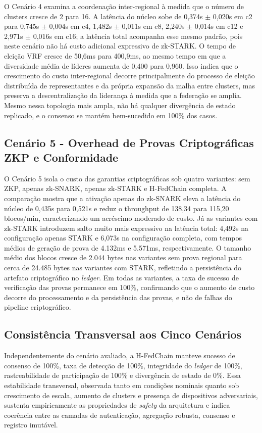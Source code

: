 \documentclass[12pt]{article}
\begin{document}
O Cenário 4 examina a coordenação inter-regional à medida que o número de clusters cresce de 2 para 16. A latência do núcleo sobe de 0,374s $\pm$ 0,020s em c2 para 0,745s $\pm$ 0,004s em c4, 1,482s $\pm$ 0,011s em c8, 2,240s $\pm$ 0,014s em c12 e 2,971s $\pm$ 0,016s em c16; a latência total acompanha esse mesmo padrão, pois neste cenário não há custo adicional expressivo de zk-STARK. O tempo de eleição VRF cresce de 50,6ms para 400,9ms, ao mesmo tempo em que a diversidade média de líderes aumenta de 0,400 para 0,960. Isso indica que o crescimento do custo inter-regional decorre principalmente do processo de eleição distribuída de representantes e da própria expansão da malha entre clusters, mas preserva a descentralização da liderança à medida que a federação se amplia. Mesmo nessa topologia mais ampla, não há qualquer divergência de estado replicado, e o consenso se mantém bem-sucedido em 100\% dos casos.

\subsection{Cenário 5 - Overhead de Provas Criptográficas ZKP e Conformidade}

O Cenário 5 isola o custo das garantias criptográficas sob quatro variantes: sem ZKP, apenas zk-SNARK, apenas zk-STARK e H-FedChain completa. A comparação mostra que a ativação apenas do zk-SNARK eleva a latência do núcleo de 0,435s para 0,521s e reduz o throughput de 138,34 para 115,20 blocos/min, caracterizando um acréscimo moderado de custo. Já as variantes com zk-STARK introduzem salto muito mais expressivo na latência total: 4,492s na configuração apenas STARK e 6,073s na configuração completa, com tempos médios de geração de prova de 4.132ms e 5.571ms, respectivamente. O tamanho médio dos blocos cresce de 2.044 bytes nas variantes sem prova regional para cerca de 24.485 bytes nas variantes com STARK, refletindo a persistência do artefato criptográfico no \textit{ledger}. Em todas as variantes, a taxa de sucesso de verificação das provas permanece em 100\%, confirmando que o aumento de custo decorre do processamento e da persistência das provas, e não de falhas do pipeline criptográfico.

\subsection{Consistência Transversal aos Cinco Cenários}

Independentemente do cenário avaliado, a H-FedChain manteve sucesso de consenso de 100\%, taxa de detecção de 100\%, integridade do \textit{ledger} de 100\%, rastreabilidade de participação de 100\% e divergência de estado de 0\%. Essa estabilidade transversal, observada tanto em condições nominais quanto sob crescimento de escala, aumento de clusters e presença de dispositivos adversariais, sustenta empiricamente as propriedades de \textit{safety} da arquitetura e indica coerência entre as camadas de autenticação, agregação robusta, consenso e registro imutável.
\end{document}
